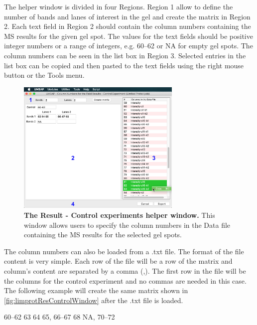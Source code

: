 The helper window is divided in four Regions. Region \num{1} allow to define the number of bands and lanes of interest in the gel and create the matrix in Region \num{2}. Each text field in Region \num{2} should contain the column numbers containing the MS results for the given gel spot. The values for the text fields should be positive integer numbers or a range of integers, e.g. \numrange[range-phrase=--]{60}{62} or NA for empty gel spots. The column numbers can be seen in the list box in Region \num{3}. Selected entries in the list box can be copied and then pasted to the text fields using the right mouse button or the Tools menu. 

\begin{figure}[h]
	\centering
	\includegraphics[width=0.7\textwidth]{./IMAGES/MOD-LIMPROT/limprot-rescontrol.jpg}
	\caption[The Result - Control experiments helper window]{\textbf{The Result - Control experiments helper window.} This window allows users to specify the column numbers in the Data file containing the MS results for the selected gel spots.} 
	\label{fig:limprotResControlWindow}
	\vspace{-5pt} 	
\end{figure}

The column numbers can also be loaded from a .txt file. The format of the file content is very simple. Each row of the file will be a row of the matrix and column's content are separated by a comma (,). The first row in the file will be the columns for the control experiment and no commas are needed in this case. The following example will create the same matrix shown in \autoref{fig:limprotResControlWindow} after the .txt file is loaded.

\numrange[range-phrase=--]{60}{62}\newline
\num{63} \num{64} \num{65}, \numrange[range-phrase=--]{66}{67} \num{68}\newline
NA, \numrange[range-phrase=--]{70}{72} 


